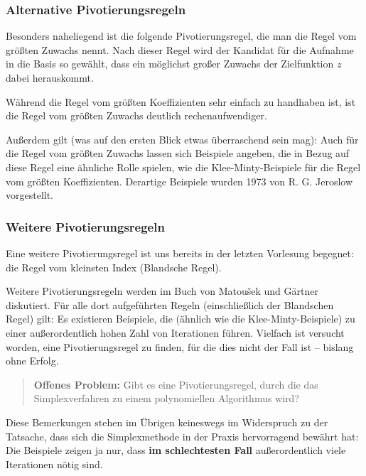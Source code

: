 \documentclass[smaller]{beamer}
\begin{document}
\begin{frame}
 \frametitle{Alternative Pivotierungsregeln}
 Besonders naheliegend ist die folgende Pivotierungsregel, die man die \alert{Regel vom größten Zuwachs} nennt. Nach dieser Regel wird der Kandidat für die Aufnahme in die Basis so gewählt, dass ein möglichst großer Zuwachs der Zielfunktion $z$ dabei herauskommt. \\ \vspace*{0.2cm}

Während die Regel vom größten Koeffizienten sehr einfach zu handhaben ist, ist die Regel vom größten Zuwachs deutlich rechenaufwendiger. \\ \vspace*{0.2cm}

Außerdem gilt (was auf den ersten Blick etwas überraschend sein mag): \alert{Auch für die Regel vom größten Zuwachs lassen sich Beispiele angeben, die in Bezug auf diese Regel eine ähnliche Rolle spielen, wie die Klee-Minty-Beispiele für die Regel vom größten Koeffizienten}. Derartige Beispiele wurden 1973 von R. G. Jeroslow vorgestellt.
\end{frame}

\begin{frame}
 \frametitle{Weitere Pivotierungsregeln}
 Eine weitere Pivotierungsregel ist uns bereits in der letzten Vorlesung begegnet: die \alert{Regel vom kleinsten Index (Blandsche Regel)}. \\ \vspace*{0.2cm}

Weitere Pivotierungsregeln werden im Buch von Matou\v{s}ek und Gärtner diskutiert. Für alle dort aufgeführten Regeln (einschließlich der Blandschen Regel) gilt: Es existieren Beispiele, die (ähnlich wie die Klee-Minty-Beispiele) zu einer außerordentlich hohen Zahl von Iterationen führen. Vielfach ist versucht worden, eine Pivotierungsregel zu finden, für die dies nicht der Fall ist -- bislang ohne Erfolg. \\ \vspace*{0.2cm}
\begin{quote}
\alert{\textbf{Offenes Problem:} Gibt es eine Pivotierungsregel, durch die das Simplexverfahren zu einem polynomiellen Algorithmus wird?}
\end{quote}

\alert{Diese Bemerkungen stehen im Übrigen keineswegs im Widerspruch zu der Tatsache, dass sich die Simplexmethode in der Praxis hervorragend bewährt hat: Die Beispiele zeigen ja nur, dass \textbf{im schlechtesten Fall} außerordentlich viele Iterationen nötig sind}.
\end{frame}
\end{document}
